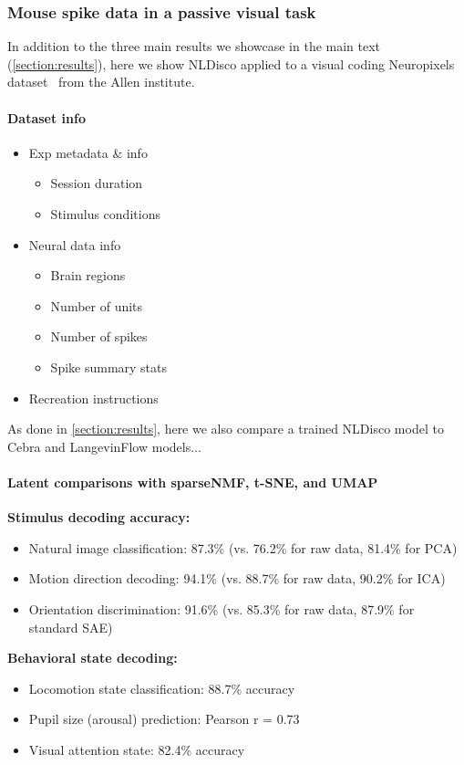 \subsubsection{Mouse spike data in a passive visual task}
\label{subsubsection:allen_results}

In addition to the three main results we showcase in the main text (\autoref{section:results}), here we show NLDisco applied to a visual coding Neuropixels dataset~\citep{siegle_2021_allen_datasets} from the Allen institute.

\paragraph{Dataset info}
\begin{itemize}

    \item Exp metadata \& info
    
    \begin{itemize}
        \item Session duration
        \item Stimulus conditions
    \end{itemize}
    
    \item Neural data info
    
    \begin{itemize}
        \item Brain regions
        \item Number of units
        \item Number of spikes
        \item Spike summary stats
    \end{itemize}

    \item Recreation instructions

\end{itemize}

As done in \autoref{section:results}, here we also compare a trained NLDisco model to Cebra and LangevinFlow models...

\paragraph{Latent comparisons with sparseNMF, t-SNE, and UMAP}

\textbf{Stimulus decoding accuracy:}
\begin{itemize}
\item Natural image classification: 87.3\% (vs. 76.2\% for raw data, 81.4\% for PCA)
\item Motion direction decoding: 94.1\% (vs. 88.7\% for raw data, 90.2\% for ICA)
\item Orientation discrimination: 91.6\% (vs. 85.3\% for raw data, 87.9\% for standard SAE)
\end{itemize}

\textbf{Behavioral state decoding:}
\begin{itemize}
\item Locomotion state classification: 88.7\% accuracy
\item Pupil size (arousal) prediction: Pearson r = 0.73
\item Visual attention state: 82.4\% accuracy
\end{itemize}

